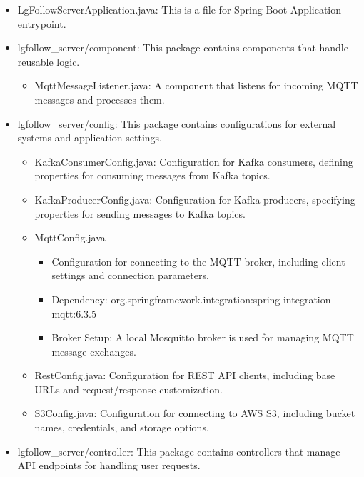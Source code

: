 \documentclass[conference]{IEEEtran}
\begin{document}
\begin{itemize}
    \item LgFollowServerApplication.java: This is a file for Spring Boot Application entrypoint. \\
    \item lgfollow\_server/component: This package contains components that handle reusable logic.
    \begin{itemize}
        \item MqttMessageListener.java: A component that listens for incoming MQTT messages and processes them. 
    \end{itemize}
    \item lgfollow\_server/config: This package contains configurations for external systems and application settings.
    \begin{itemize}
        \item KafkaConsumerConfig.java: Configuration for Kafka consumers, defining properties for consuming messages from Kafka topics. \\
        \item KafkaProducerConfig.java: Configuration for Kafka producers, specifying properties for sending messages to Kafka topics. \\
        \item MqttConfig.java
\begin{itemize}
    \item Configuration for connecting to the MQTT broker, including client settings and connection parameters.\\
    \item Dependency: org.springframework.integration:spring-integration-mqtt:6.3.5\\
    \item Broker Setup: A local Mosquitto broker is used for managing MQTT message exchanges.\\
\end{itemize}
        \item RestConfig.java: Configuration for REST API clients, including base URLs and request/response customization. \\
        \item S3Config.java: Configuration for connecting to AWS S3, including bucket names, credentials, and storage options. \\
    \end{itemize}
    \item lgfollow\_server/controller: This package contains controllers that manage API endpoints for handling user requests.

\end{itemize}
\end{document}

